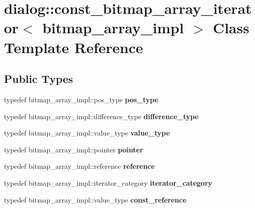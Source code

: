 \hypertarget{classdialog_1_1const__bitmap__array__iterator}{}\section{dialog\+:\+:const\+\_\+bitmap\+\_\+array\+\_\+iterator$<$ bitmap\+\_\+array\+\_\+impl $>$ Class Template Reference}
\label{classdialog_1_1const__bitmap__array__iterator}
\subsection*{Public Types}
\begin{DoxyCompactItemize}
\item 
\mbox{\label{classdialog_1_1const__bitmap__array__iterator_aea801458a2f710f42ed8b0d9187e3da2}} 
typedef bitmap\+\_\+array\+\_\+impl\+::pos\+\_\+type {\bfseries pos\+\_\+type}
\item 
\mbox{\label{classdialog_1_1const__bitmap__array__iterator_afd5cfd9700068580567a6e215762488f}} 
typedef bitmap\+\_\+array\+\_\+impl\+::difference\+\_\+type {\bfseries difference\+\_\+type}
\item 
\mbox{\label{classdialog_1_1const__bitmap__array__iterator_a80b195a60fa01aa6d3afcaaab278b3a0}} 
typedef bitmap\+\_\+array\+\_\+impl\+::value\+\_\+type {\bfseries value\+\_\+type}
\item 
\mbox{\label{classdialog_1_1const__bitmap__array__iterator_a50c79fb683611b8029bcf65170ca82f5}} 
typedef bitmap\+\_\+array\+\_\+impl\+::pointer {\bfseries pointer}
\item 
\mbox{\label{classdialog_1_1const__bitmap__array__iterator_ae33f32321e8dd032e6ee540aa5b254e2}} 
typedef bitmap\+\_\+array\+\_\+impl\+::reference {\bfseries reference}
\item 
\mbox{\label{classdialog_1_1const__bitmap__array__iterator_a06e9f1b244152e2b72509edc3869f0a3}} 
typedef bitmap\+\_\+array\+\_\+impl\+::iterator\+\_\+category {\bfseries iterator\+\_\+category}
\item 
\mbox{\label{classdialog_1_1const__bitmap__array__iterator_aa5a7754abd2dfe01104e1898951ea5b0}} 
typedef bitmap\+\_\+array\+\_\+impl\+::value\+\_\+type {\bfseries const\+\_\+reference}
\end{DoxyCompactItemize}
